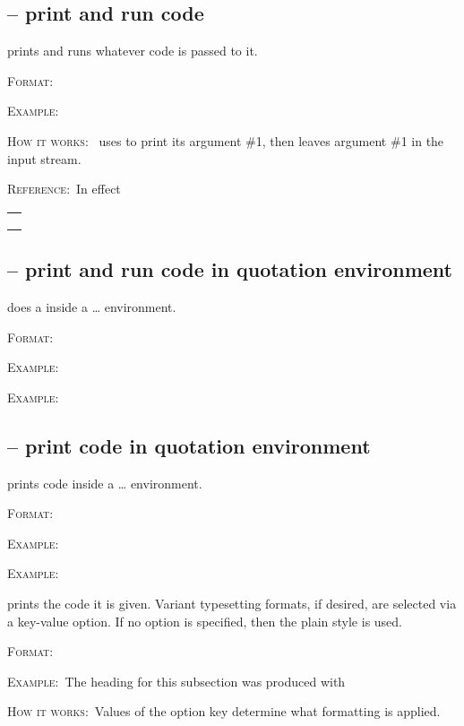 \documentclass{article}
\newcommand{\ff}{\par\textsc{Format:~}}
\newcommand{\ee}{\par\textsc{Example:~}}
\newcommand{\hh}{\par\textsc{How it works:~}}
\newcommand{\rr}{\par\textsc{Reference:~}}
\newcommand{\reftable}[1]{%
\begin{center}
\begin{tabular}{l}
#1 
\end{tabular}
\end{center}

}
\begin{document}
\subsection{\cs{\cdr} -- print and run code}
\cs{\cdr} prints and runs whatever code is passed to it.
\ff\cs{\cdr}
\ee
{}
\hh\cs{\cdr} uses \codedetok{\detokenize} to print its argument \#1, then leaves argument \#1 in the input stream.
\rr In effect
\par\reftable{\codedetokb{\detokenize\{\#1\}} \\ \codegeneral{\$\textbackslash mapsto\$} \\ \codegeneral{\#1} \\}


\subsection{\cs{\cdrq} -- print and run code in quotation environment}
\cs{\cdrq} does a \cs{\cdr} inside a  \ldots  {} environment.
\ff\cs{\cdrq}
\ee
{}
\ee
{}

\subsection{\cs{\cdq} -- print code in quotation environment}
\cs{\cdq} prints code inside a  \ldots  {} environment.
\ff\cs{\cdq}
\ee
{}
\ee
{}





\cs{\cdrd} prints the code it is given. Variant typesetting formats, if desired, are selected via a key-value option. If no option is specified, then the plain style is used.
\ff\cs{\cdrd}
\ee The heading for this subsection was produced with 
\hh Values of the  option key determine what formatting is applied.
\end{document}
